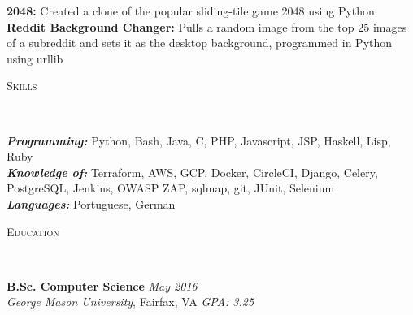 \documentclass[9pt]{article}
\newenvironment{changemargin}[2]{%
  \begin{list}{}{%
    \setlength{\topsep}{0pt}%
    \setlength{\leftmargin}{#1}%
    \setlength{\rightmargin}{#2}%
    \setlength{\listparindent}{\parindent}%
    \setlength{\itemindent}{\parindent}%
    \setlength{\parsep}{\parskip}%
  }%
  \item[]}{\end{list}
}
\newcommand{\lineover}{
	\begin{changemargin}{-0.05in}{-0.05in}
		\vspace*{-8pt}
		\hrulefill \\
		\vspace*{-2pt}
	\end{changemargin}
}
\newcommand{\header}[1]{
	\begin{changemargin}{-0.5in}{-0.5in}
		\scshape{#1}\\
  	\lineover
	\end{changemargin}
}
\newenvironment{body} {
	\vspace*{-10pt}
	\begin{changemargin}{-0.25in}{-0.5in}
  }	
	{\end{changemargin}
}
\begin{document}
\begin{body}
	\vspace{14pt}
	{\textbf{2048:}}{} Created a clone of the popular sliding-tile game 2048 using Python.\\
	\vspace{4pt}
	{\textbf{Reddit Background Changer:}}{} Pulls a random image from the top 25 images of a subreddit and sets it as the desktop background, programmed in Python using urllib\\
	\vspace{14pt}
\end{body}

\header{Skills}

\begin{body}
	\vspace{14pt}
	\emph{\textbf{Programming:}}{} Python, Bash, Java, C, PHP, Javascript, JSP, Haskell, Lisp, Ruby\\
	\smallskip
	\emph{\textbf{Knowledge of:}}{} Terraform, AWS, GCP, Docker, CircleCI, Django, Celery, PostgreSQL, Jenkins, OWASP ZAP, sqlmap, git, JUnit, Selenium \\
	\smallskip
	\emph{\textbf{Languages:}}{} Portuguese, German \\
\end{body}
\vspace{14pt}
\header{Education}

\begin{body}
	\vspace{14pt}
	\textbf{B.Sc. Computer Science }{} \hfill \emph{May 2016}{} \\
	\emph{George Mason University}, Fairfax, VA \hfill \emph{GPA: 3.25} \\
	\vspace{4pt}
\end{body}
\smallskip
\end{document}
